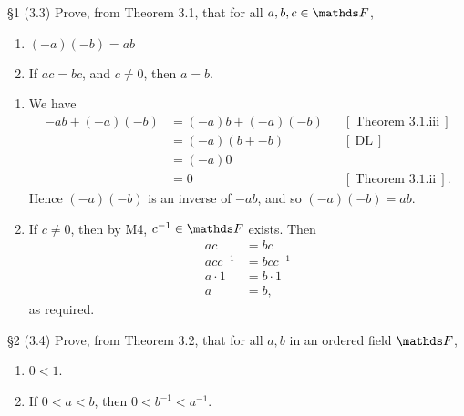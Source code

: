 \documentclass{homework}
\begin{document}
\begin{problem}{\S 1}
  (3.3) Prove, from Theorem 3.1, that for all $a,b,c \in \F$,
  \begin{enumerate}[label=(\alph*)]
    \item $(-a)(-b)=ab$ 
    \item If $ac=bc$, and $c\neq 0$, then $a=b$.
  \end{enumerate}
\end{problem}

\begin{solution}
  \begin{enumerate}[label=(\alph*)]
    \item We have
      \begin{align*}
        -ab+(-a)(-b) &= (-a)b+(-a)(-b) && [~\text{Theorem 3.1.iii}~] \\
                     &= (-a)(b+ -b) && [~\text{DL}~] \\
                     &= (-a)0 \\
                     &= 0 && [~\text{Theorem 3.1.ii}~]
                   .\end{align*} Hence $(-a)(-b)$ is an inverse of $-ab$, and so $(-a)(-b)=ab$.
    \item If $c\neq 0$, then by M4,  $c^{-1}\in \F$ exists. Then
      \begin{align*}
        ac&= bc \\
        acc^{-1}&=bc c^{-1}\\
        a\cdot 1&= b\cdot 1 \\
        a&=b
      ,\end{align*} as required.
  \end{enumerate}
\end{solution}

\begin{problem}{\S 2}
  (3.4) Prove, from Theorem 3.2, that for all $a,b$ in an ordered field $\F$, 
  \begin{enumerate}[label=(\alph*)]
    \item $0 < 1$.
    \item If $0<a<b$, then $0<b^{-1}<a^{-1}$.
  \end{enumerate}
\end{problem}
\end{document}
